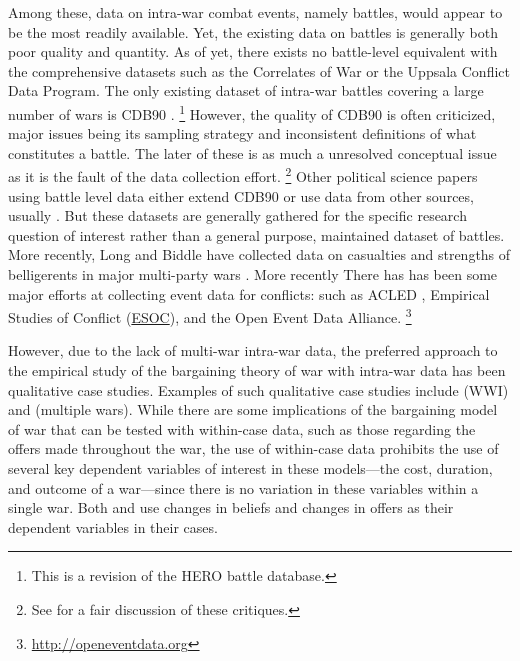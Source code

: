 Among these, data on intra-war combat events, namely battles, would appear to be the most readily available.
Yet, the existing data on battles is generally both poor quality and quantity.
As of yet, there exists no battle-level equivalent with the comprehensive datasets such as the Correlates of War \parencite{SarkeesWayman2010} or the Uppsala Conflict Data Program.
The only existing dataset of intra-war battles covering a large number of wars is CDB90 \parencite{cdb90}.%
\footnote{This is a revision of the HERO battle database.}
However, the quality of CDB90 is often criticized, major issues being its sampling strategy and inconsistent definitions of what constitutes a battle.
The later of these is as much a unresolved conceptual issue as it is the fault of the data collection effort.%
\footnote{See \textcite{BiddleLong2004} for a fair discussion of these critiques.}
Other political science papers using battle level data either extend CDB90 or use data from other sources, usually \textcite{Clodfelter2008}.
But these datasets are generally gathered for the specific research question of interest rather than a general purpose, maintained dataset of battles.
More recently, Long and Biddle have collected data on casualties and strengths of belligerents in major multi-party wars \parencite{CochranLong2014}.
More recently There has has been some major efforts at collecting event data for conflicts:
such as ACLED \parencites{RaleighLinkeHegreEtAl2010}, Empirical Studies of Conflict (\href{http://esoc.princeton.edu/}{ESOC}), and the Open Event Data Alliance.%
\footnote{\url{http://openeventdata.org}}

However, due to the lack of multi-war intra-war data, the preferred approach to the empirical study of the bargaining theory of war with intra-war data has been qualitative case studies\parencites{Reiter2003}[][Chapter 9]{Reiter2009}.
Examples of such qualitative case studies include  \textcite{Goemans2000} (WWI) and \textcite{Reiter2009} (multiple wars).
While there are some implications of the bargaining model of war that can be tested with within-case data, such as those regarding the offers made throughout the war, the use of within-case data prohibits the use of several key dependent variables of interest in these models---the cost, duration, and outcome of a war---since there is no variation in these variables within a single war.
Both \textcite{Reiter2009} and \textcite{Goemans2000} use changes in beliefs and changes in offers as their dependent variables in their cases.

